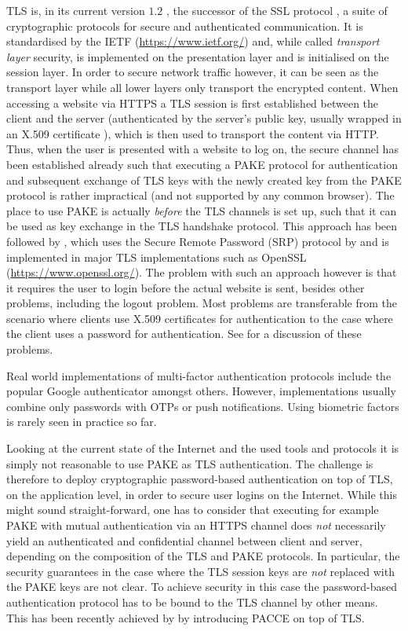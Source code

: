 \ac{TLS} is, in its current version $1.2$ \cite{rfc5246,rfc6176,rfc4492}, the successor of the \ac{SSL} protocol \cite{rfc6101}, a suite of cryptographic protocols for secure and authenticated communication.
It is standardised by the \ac{IETF} (\url{https://www.ietf.org/}) and, while called \emph{transport layer} security, is implemented on the presentation layer and is initialised on the session layer.
In order to secure network traffic however, it can be seen as the transport layer while all lower layers only transport the encrypted content.
When accessing a website via \ac{HTTPS} a \ac{TLS} session is first established between the client and the server (authenticated by the server's public key, usually wrapped in an X.509 certificate \cite{rfc5280}), which is then used to transport the content via \ac{HTTP}.
Thus, when the user is presented with a website to log on, the secure channel has been established already such that executing a \ac{PAKE} protocol for authentication and subsequent exchange of \ac{TLS} keys with the newly created key from the \ac{PAKE} protocol is rather impractical (and not supported by any common browser).
The place to use \ac{PAKE} is actually \emph{before} the \ac{TLS} channels is set up, such that it can be used as key exchange in the \ac{TLS} handshake protocol.
This approach has been followed by \citet{rfc5054}, which uses the Secure Remote Password (SRP) protocol by \citet{Wu98} and is implemented in major \ac{TLS} implementations such as OpenSSL (\url{https://www.openssl.org/}).
The problem with such an approach however is that it requires the user to login before the actual website is sent, besides other problems, including the logout problem.
Most problems are transferable from the scenario where clients use X.509 certificates for authentication to the case where the client uses a password for authentication.
See \citet{Parsovs14} for a discussion of these problems.

Real world implementations of multi-factor authentication protocols include the popular Google authenticator \cite{GAuthenticator} amongst others.
However, implementations usually combine only passwords with \acp{OTP} or push notifications.
Using biometric factors is rarely seen in practice so far.

Looking at the current state of the Internet and the used tools and protocols it is simply not reasonable to use \ac{PAKE} as \ac{TLS} authentication.
The challenge is therefore to deploy cryptographic password-based authentication on top of \ac{TLS}, \ie on the application level, in order to secure user logins on the Internet.
While this might sound straight-forward, one has to consider that executing for example \ac{PAKE} with mutual authentication via an \ac{HTTPS} channel does \emph{not} necessarily yield an authenticated and confidential channel between client and server, depending on the composition of the \ac{TLS} and \ac{PAKE} protocols.
In particular, the security guarantees in the case where the \ac{TLS} session keys are \emph{not} replaced with the \ac{PAKE} keys are not clear.
To achieve security in this case the password-based authentication protocol has to be bound to the \ac{TLS} channel by other means.
This has been recently achieved by \citet{MSD13} by introducing \ac{PACCE} on top of \ac{TLS}.


